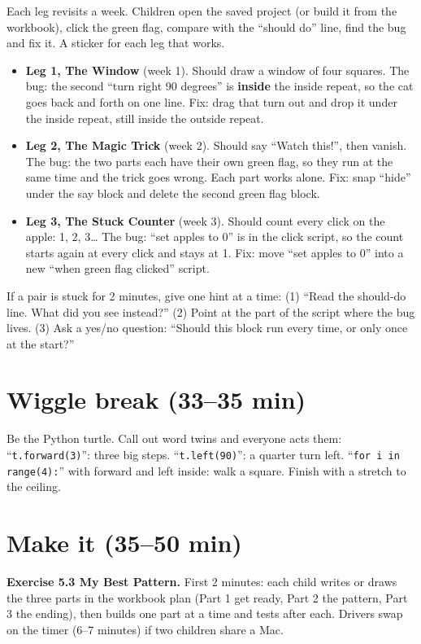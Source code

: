 \begin{bughunt}
Each leg revisits a week. Children open the saved project (or build it from the workbook), click the green flag, compare with the \enquote{should do} line, find the bug and fix it. A sticker for each leg that works.
\begin{itemize}[leftmargin=1.2em,itemsep=1pt]
  \item \textbf{Leg 1, The Window} (week 1). Should draw a window of four squares. The bug: the second \enquote{turn right 90 degrees} is \textbf{inside} the inside repeat, so the cat goes back and forth on one line. Fix: drag that turn out and drop it under the inside repeat, still inside the outside repeat.
  \item \textbf{Leg 2, The Magic Trick} (week 2). Should say \enquote{Watch this!}, then vanish. The bug: the two parts each have their own green flag, so they run at the same time and the trick goes wrong. Each part works alone. Fix: snap \enquote{hide} under the say block and delete the second green flag block.
  \item \textbf{Leg 3, The Stuck Counter} (week 3). Should count every click on the apple: 1, 2, 3\ldots{} The bug: \enquote{set apples to 0} is in the click script, so the count starts again at every click and stays at 1. Fix: move \enquote{set apples to 0} into a new \enquote{when green flag clicked} script.
\end{itemize}
If a pair is stuck for 2 minutes, give one hint at a time: (1) \enquote{Read the should-do line. What did you see instead?} (2) Point at the part of the script where the bug lives. (3) Ask a yes/no question: \enquote{Should this block run every time, or only once at the start?}
\end{bughunt}

\section{Wiggle break (33--35 min)}
Be the Python turtle. Call out word twins and everyone acts them: \enquote{\texttt{t.forward(3)}}: three big steps. \enquote{\texttt{t.left(90)}}: a quarter turn left. \enquote{\texttt{for i in range(4):}} with forward and left inside: walk a square. Finish with a stretch to the ceiling.

\section{Make it (35--50 min)}
\textbf{Exercise 5.3 My Best Pattern.} First 2 minutes: each child writes or draws the three parts in the workbook plan (Part 1 get ready, Part 2 the pattern, Part 3 the ending), then builds one part at a time and tests after each. Drivers swap on the timer (6--7 minutes) if two children share a Mac.

